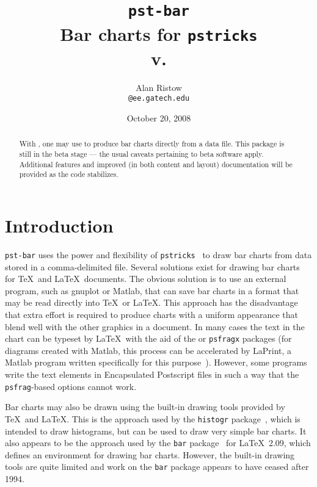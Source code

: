 \documentclass[11pt,english,BCOR10mm,DIV12,bibliography=totoc,parskip=false,smallheadings
    headexclude,footexclude,oneside]{pst-doc}
\makeatletter
\let\pstBarVersion\fileversion
\def\switchemail#1{\expandafter\@switchemail#1\@stop}
\makeatother
\begin{document}
\title{\texttt{pst-bar}\\ Bar charts for \texttt{pstricks}\\
    {\small v.\pstBarVersion}}
\author{Alan Ristow\\
    \texttt{\switchemail{ristow@ee.gatech.edu}}}
\date{October 20, 2008}
\maketitle

  \begin{abstract}
    With , one may use  to produce bar charts
    directly from a data file. This package is still in the beta stage --- the
    usual caveats pertaining to beta software apply. Additional features and
    improved (in both content and layout) documentation will be provided as the
    code stabilizes.
  \end{abstract}

\section{Introduction}
    \verb|pst-bar| uses the power and flexibility of
    \verb|pstricks|~\cite{vanzandt:93} to draw bar charts from data stored in a
    comma-delimited file. Several solutions exist for drawing bar charts for
    \TeX\ and \LaTeX\ documents. The obvious solution is to use an external
    program, such as gnuplot or Matlab, that can save bar charts in a format
    that may be read directly into \TeX\ or \LaTeX. This approach has the
    disadvantage that extra effort is required to produce charts with a uniform
    appearance that blend well with the other graphics in a document. In many
    cases the text in the chart can be typeset by \LaTeX\ with the aid of the
     or \verb|psfragx| packages (for diagrams created with Matlab,
    this process can be accelerated by LaPrint, a Matlab program written
    specifically for this purpose~\cite{linneman:04}). However, some programs
    write the text elements in Encapsulated Postscript files in such a way that
    the \verb|psfrag|-based options cannot work.

    Bar charts may also be drawn using the built-in drawing tools provided by
    \TeX\ and \LaTeX. This is the approach used by the \verb|histogr|
    package~\cite{schopf:97}, which is intended to draw histograms, but can be
    used to draw very simple bar charts. It also appears to be the approach
    used by the \verb|bar| package~\cite{bleser:94} for \LaTeX\ 2.09, which
    defines an environment for drawing bar charts. However, the built-in
    drawing tools are quite limited and work on the \verb|bar| package appears
    to have ceased after 1994.
\end{document}
